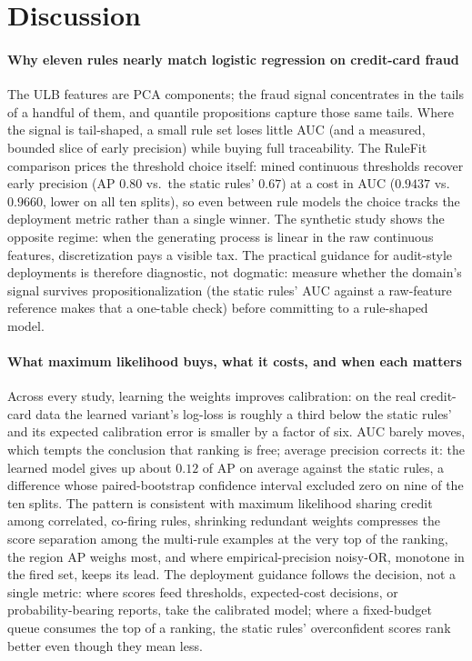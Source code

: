\section{Discussion}\label{sec:discussion}

\paragraph{Why eleven rules nearly match logistic regression on
credit-card fraud} The ULB features are PCA components; the fraud
signal concentrates in the tails of a handful of them, and quantile
propositions capture those same tails. Where the signal is
tail-shaped, a small rule set loses little AUC (and a measured, bounded
slice of early precision) while buying full traceability. The RuleFit
comparison prices the threshold choice itself: mined continuous
thresholds recover early precision (AP $0.80$ vs.\ the static rules'
$0.67$) at a cost in AUC ($0.9437$ vs.\ $0.9660$, lower on all ten
splits), so even between rule models the choice tracks the deployment
metric rather than a single winner. The synthetic study shows the opposite regime: when the
generating process is linear in the raw continuous features,
discretization pays a visible tax. The practical guidance for
audit-style deployments is therefore diagnostic, not dogmatic: measure
whether the domain's signal survives propositionalization (the static
rules' AUC against a raw-feature reference makes that a one-table
check) before committing to a rule-shaped model.

\paragraph{What maximum likelihood buys, what it costs, and when each
matters} Across every study, learning the weights improves
calibration: on the real credit-card data the learned variant's
log-loss is
roughly a third below the static rules' and its expected calibration
error is smaller by a factor of six. AUC barely moves, which tempts the
conclusion that ranking is free; average precision corrects it: the
learned model gives up about $0.12$ of AP on average against the
static rules, a difference whose paired-bootstrap confidence interval
excluded zero on nine of the ten splits. The pattern is consistent with maximum
likelihood sharing credit among correlated, co-firing rules,
shrinking redundant weights compresses the score separation among the
multi-rule examples at the very top of the ranking, the region
AP weighs most, and where empirical-precision noisy-OR, monotone in the
fired set, keeps its lead. The deployment guidance follows the
decision, not a single metric: where scores feed thresholds,
expected-cost decisions, or probability-bearing reports, take the
calibrated model; where a fixed-budget queue consumes the top of a
ranking, the static rules' overconfident scores rank better even
though they mean less.

